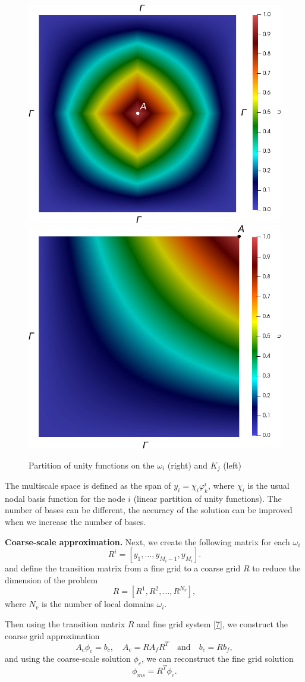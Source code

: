 \documentclass[authoryear]{elsarticle}
\begin{document}
\begin{figure}[ht]
	\centering
		\includegraphics[width=0.45\linewidth]{pofs.png} \hspace{2em}
		\includegraphics[width=0.45\linewidth]{pouK.png} 
	\caption{Partition of unity functions on the $\omega_i$ (right) and $K_j$ (left)}
	\label{p2}
\end{figure} 
 
The multiscale space is defined as the span of $y_i = \chi_i \varphi^i_k$, where $\chi_i$ is the usual nodal basis function for the node $i$ (linear partition of unity functions). 
The number of bases can be different, the accuracy of the solution can be improved when we increase the number of bases.

\textbf{Coarse-scale approximation.}
Next, we create the following matrix for each $\omega_i$
\[
	R^i = \left[ y_1, \dots, y_{M_i-1},  y_{M_i} \right].
\]
and define the transition matrix from a fine grid to a coarse grid $R$ to reduce the dimension of the problem
\[
	R = [R^1, R^2, \dots, R^{N_v}],
\]
where $N_v$ is the number of local domains $\omega_i$.

Then using the transition matrix $R$ and fine grid system \eqref{7}, we construct the coarse grid approximation
\[
	A_c \phi_c = b_c, \quad 
	A_c = R A_f R^T \quad 
	\text{and} \quad 
	b_c = R b_f,
\]
and using the coarse-scale solution $\phi_c$, we can reconstruct the fine grid solution 
\[
	\phi_{ms} = R^T \phi_c.
\]
\end{document}
